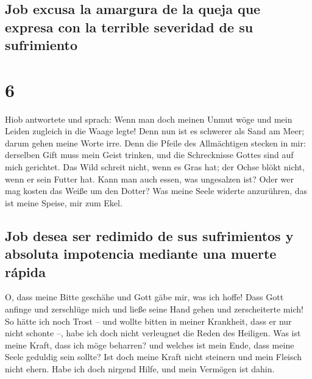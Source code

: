 \hypertarget{job-excusa-la-amargura-de-la-queja-que-expresa-con-la-terrible-severidad-de-su-sufrimiento}{%
\subsection{Job excusa la amargura de la queja que expresa con la
terrible severidad de su
sufrimiento}\label{job-excusa-la-amargura-de-la-queja-que-expresa-con-la-terrible-severidad-de-su-sufrimiento}}

\hypertarget{section-5}{%
\section{6}\label{section-5}}

 Hiob antwortete und sprach:  Wenn man doch
meinen Unmut wöge und mein Leiden zugleich in die Waage legte!
 Denn nun ist es schwerer als Sand am Meer; darum gehen
meine Worte irre.  Denn die Pfeile des Allmächtigen
stecken in mir: derselben Gift muss mein Geist trinken, und die
Schrecknisse Gottes sind auf mich gerichtet.  Das Wild
schreit nicht, wenn es Gras hat; der Ochse blökt nicht, wenn er sein
Futter hat.  Kann man auch essen, was ungesalzen ist? Oder
wer mag kosten das Weiße um den Dotter?  Was meine Seele
widerte anzurühren, das ist meine Speise, mir zum Ekel.

\hypertarget{job-desea-ser-redimido-de-sus-sufrimientos-y-absoluta-impotencia-mediante-una-muerte-ruxe1pida}{%
\subsection{Job desea ser redimido de sus sufrimientos y absoluta
impotencia mediante una muerte
rápida}\label{job-desea-ser-redimido-de-sus-sufrimientos-y-absoluta-impotencia-mediante-una-muerte-ruxe1pida}}

 O, dass meine Bitte geschähe und Gott gäbe mir, was ich
hoffe!  Dass Gott anfinge und zerschlüge mich und ließe
seine Hand gehen und zerscheiterte mich!  So hätte ich
noch Trost -- und wollte bitten in meiner Krankheit, dass er nur nicht
schonte --, habe ich doch nicht verleugnet die Reden des Heiligen.
 Was ist meine Kraft, dass ich möge beharren? und welches
ist mein Ende, dass meine Seele geduldig sein sollte? 
Ist doch meine Kraft nicht steinern und mein Fleisch nicht ehern.
 Habe ich doch nirgend Hilfe, und mein Vermögen ist
dahin.

